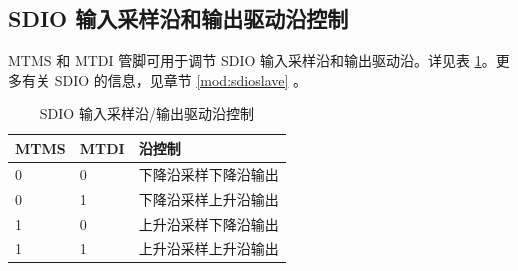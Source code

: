 \documentclass[main\_\_CN.tex]{subfiles}
\begin{document}
\subsection{SDIO 输入采样沿和输出驱动沿控制}

MTMS 和 MTDI 管脚可用于调节 SDIO 输入采样沿和输出驱动沿。详见表 \ref{tab:2.8-sdio-strapping}。更多有关 SDIO 的信息，见章节 \ref{mod:sdioslave} \textit{}。

\begin{table}[H]
    \centering
    \caption{SDIO 输入采样沿/输出驱动沿控制}
   \label{tab:2.8-sdio-strapping}

    \begin{threeparttable}
    \begin{tabular}{ | p{1.8cm}<{\centering} | p{1.8cm}<{\centering} | p{3.8cm}| }
    \hline
        \rowcolor{lightgray}
        \textbf{MTMS} & \textbf{MTDI} & \textbf{沿控制} \\\hline

        0 & 0 & 下降沿采样下降沿输出 \\\hline
        0 & 1 & 下降沿采样上升沿输出 \\\hline
        1 & 0 & 上升沿采样下降沿输出 \\\hline
        1 & 1 & 上升沿采样上升沿输出 \\\hline
        \end{tabular}
     \end{threeparttable}
\end{table}



\end{document}
